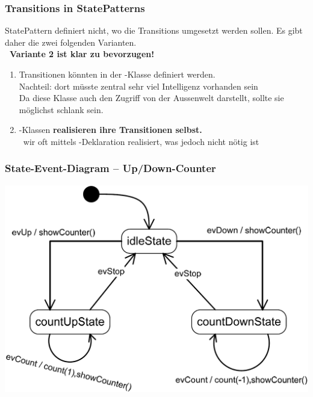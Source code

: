 \subsubsection{Transitions in StatePatterns}

StatePattern definiert nicht, wo die Transitions umgesetzt werden sollen. Es gibt daher die zwei folgenden Varianten. \\
\textbf{ \textrightarrow\ Variante 2 ist klar zu bevorzugen!}

\vspace{0.2cm}

\begin{enumerate}
    \item Transitionen könnten in der -Klasse definiert werden. \\
        Nachteil: dort müsste zentral sehr viel Intelligenz vorhanden sein \\
        Da diese Klasse auch den Zugriff von der Aussenwelt darstellt, sollte sie möglichst schlank sein.
    \item {}-Klassen \textbf{realisieren ihre Transitionen selbst.} \\
        \textrightarrow\ wir oft mittels -Deklaration realisiert, was jedoch nicht nötig ist
\end{enumerate}


\subsubsection{State-Event-Diagram -- Up/Down-Counter}
\label{State-Event-Diagram -- Up/Down-Counter - StatePattern}

\begin{center}
    \includegraphics[width=0.7\columnwidth]{images/fsm_up-down-counter_diagramm_state_pattern.png}
\end{center}


